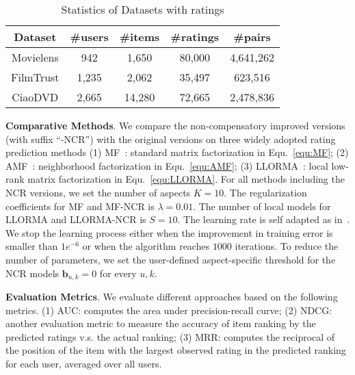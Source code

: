 \documentclass[letterpaper]{article} %
\begin{document}
\begin{table}[htp]
\tiny
\caption{Statistics of Datasets with ratings}
\begin{center}
\begin{tabular}{|c|c|c|c|c|}
\hline
Dataset & \#users & \#items & \#ratings & \#pairs \\\hline
Movielens &942 &1,650 &80,000 &4,641,262 \\\hline
FilmTrust &1,235 &2,062 &35,497 &623,516 \\\hline
CiaoDVD &2,665 &14,280 &72,665 &2,478,836 \\\hline
\end{tabular}
\end{center}
\label{tab:datasets}
\end{table}%
 

\textbf{Comparative Methods}. We compare the non-compensatory improved versions (with suffix ``-NCR'') with the original versions on three widely adopted rating prediction methods (1) MF~\cite{Koren2009Matrix}: standard matrix factorization in Equ.~\ref{equ:MF};  (2) AMF~\cite{Koren2008Factorization}: neighborhood factorization in Equ.~\ref{equ:AMF}; (3) LLORMA~\cite{Lee2013Local}: local low-rank matrix factorization in Equ.~\ref{equ:LLORMA}. For all methods including the NCR versions, we set the number of aspects $K=10$. The regularization coefficients for MF and MF-NCR is $\lambda=0.01$. The number of local models for LLORMA and LLORMA-NCR is $S=10$. The learning rate is self adapted as in~\cite{Wilson2003general}.  We stop the learning process either when the improvement in training error is smaller than $1e^{-6}$ or when the algorithm reaches $1000$ iterations. To reduce the number of parameters, we set the user-defined aspect-specific threshold for the NCR models $\mathbf{b}_{u,k}=0$ for every $u,k$. 

\textbf{Evaluation Metrics}.  We evaluate different approaches based on the following metrics. (1) AUC: computes the area under precision-recall curve; (2) NDCG: another evaluation metric to measure the accuracy of item ranking by the predicted ratings v.s. the actual ranking;  (3)  MRR: computes the reciprocal of the position of the item with the largest observed rating in the predicted ranking for each user, averaged over all users. %
\end{document}
